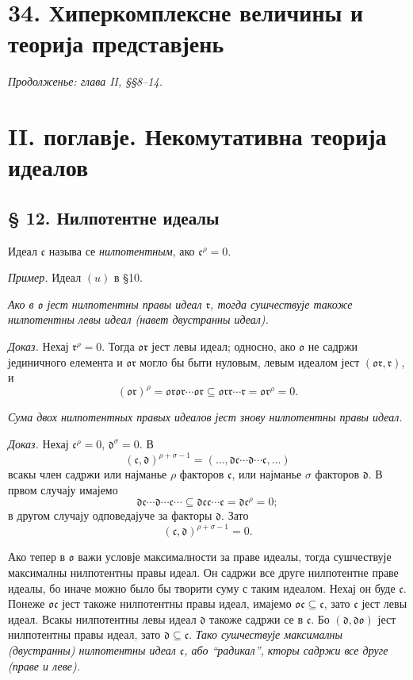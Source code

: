 ﻿\documentclass[11pt]{article}
\providecommand{\mc}{\mathfrak{c}}
\providecommand{\md}{\mathfrak{d}}
\providecommand{\mo}{\mathfrak{o}}
\providecommand{\mr}{\mathfrak{r}}
\begin{document}
\section*{34. Хиперкомплексне величины и теорија представјень}
\emph{Продолженье: глава II, §§8--14.}

\section*{II. поглавје. Некомутативна теорија идеалов}

\subsection*{§ 12. Нилпотентне идеалы}

Идеал $\mc$ называ се \emph{нилпотентным}, ако $\mc^\rho=0$.

\emph{Пример.} Идеал $(u)$ в §10.

\emph{Ако в $\mo$ јест нилпотентны правы идеал $\mr$, тогда сушчествује такоже нилпотентны левы идеал (навет двустранны идеал).}

\emph{Доказ.} Нехај $\mr^\rho=0$. Тогда $\mo\mr$ јест левы идеал; односно, ако $\mo$ не садржи јединичного елемента и $\mo\mr$ могло бы быти нуловым, левым идеалом јест $(\mo\mr,\mr)$, и
\[
        (\mo\mr)^\rho=\mo\mr\mo\mr\cdots\mo\mr
        \subseteq\mo\mr\mr\cdots\mr=\mo\mr^\rho=0.
\]

\emph{Сума двох нилпотентных правых идеалов јест знову нилпотентны правы идеал.}

\emph{Доказ.} Нехај $\mc^\rho=0$, $\md^\sigma=0$. В
\[
        (\mc,\md)^{\rho+\sigma-1}=(\ldots,\md\mc\cdots\md\cdots\mc,\ldots)
\]
всакы член садржи или најманье $\rho$ факторов $\mc$, или најманье $\sigma$ факторов $\md$. В првом случају имајемо
\[
        \md\mc\cdots\md\cdots\mc\cdots\subseteq\md\mc\mc\cdots\mc=\md\mc^\rho=0;
\]
в другом случају одповедајуче за факторы $\md$. Зато
\[
        (\mc,\md)^{\rho+\sigma-1}=0.
\]

Ако тепер в $\mo$ важи условје максималности за праве идеалы, тогда сушчествује максималны нилпотентны правы идеал. Он садржи все друге нилпотентне праве идеалы, бо иначе можно было бы творити суму с таким идеалом. Нехај он буде $\mc$. Понеже $\mo\mc$ јест такоже нилпотентны правы идеал, имајемо $\mo\mc\subseteq\mc$, зато $\mc$ јест левы идеал. Всакы нилпотентны левы идеал $\md$ такоже садржи се в $\mc$. Бо $(\md,\md\mo)$ јест нилпотентны правы идеал, зато $\md\subseteq\mc$. \emph{Тако сушчествује максималны (двустранны) нилпотентны идеал $\mc$, або “радикал”, кторы садржи все друге (праве и леве).}
\end{document}

